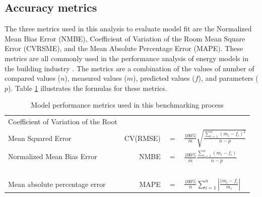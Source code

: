 \documentclass[preprint,12pt]{elsarticle}
\begin{document}




\subsection{Accuracy metrics}
The three metrics used in this analysis to evaluate model fit are the Normalized Mean Bias Error (NMBE), Coefficient of Variation of the Room Mean Square Error (CVRSME), and the Mean Absolute Percentage Error (MAPE). These metrics are all commonly used in the performance analysis of energy models in the building industry \cite{guideline2014guideline, organisation2007international}. The metrics are a combination of the values of number of compared values ($n$), measured values ($m$), predicted values ($f$), and parameters ($p$). Table \ref{table:metrics} illustrates the formulas for these metrics.

\begin{table}[h!]
\caption{Model performance metrics used in this benchmarking process}

\centering
\begin{tabular}{l r @{} >{${}}c<{{}$} @{} l}
\toprule
Coefficient of Variation of the Root \\Mean Squared Error & CV(RMSE) &= &$\displaystyle\frac{100\%}{\bar{m}}\sqrt{\frac{\sum_{i=1}^{n}(m_i-f_i)^2}{n-p}}$   \\
\midrule
Normalized Mean Bias Error & NMBE &= &$\displaystyle\frac{100\%}{\bar{m}}\frac{\sum_{i=1}^{n}(m_i-f_i)}{n-p}$   \\
 \\
\midrule
Mean absolute percentage error & MAPE &= &$\displaystyle\frac{100\%}{n}\sum_{i=1}^{n}\left |\frac{(m_i-f_i}{m_i}\right|$\\
\bottomrule
\end{tabular}
\label{table:metrics}
\end{table}
\end{document}

